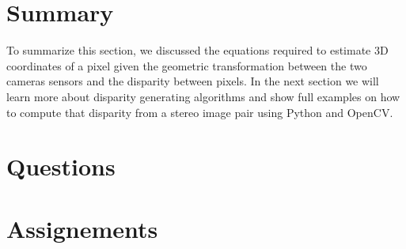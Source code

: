 \section{Summary}

To summarize this section,  we discussed  the equations required to estimate 3D
coordinates of a pixel given the geometric
transformation between the two cameras sensors and
the disparity between pixels. In the next section we will learn more about disparity generating algorithms and show
full examples on how to compute that disparity from a stereo image pair using Python and OpenCV.

\section{Questions}

\section{Assignements}